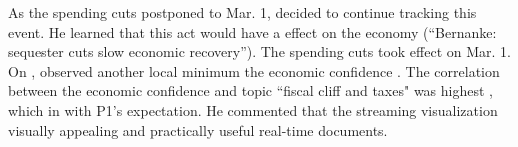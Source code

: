 
As the spending cuts  postponed to Mar. 1,  decided to continue tracking this event.
He learned that this act would have a  effect on the economy (``Bernanke: sequester cuts slow economic recovery'').
The spending cuts took effect on Mar. 1.
On ,  observed another local minimum  the economic confidence .
The correlation between the economic confidence and  topic ``fiscal cliff and taxes" was  highest ,
which  in  with P1's expectation.
He commented that the streaming visualization  visually appealing and practically useful  %
 real-time documents.

